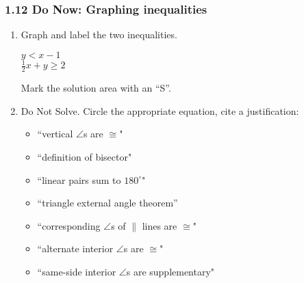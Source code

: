 \documentclass[12pt, twoside]{article}
\begin{document}
\subsubsection*{1.12 Do Now: Graphing inequalities}
\begin{enumerate}
  \item Graph and label the two inequalities.

  \begin{multicols}{2}
    $y < x-1$ \\
    $\frac{1}{2}x + y \geq 2$
    \end{multicols} \vspace{1cm}

  \begin{center} %
  \end{center}

Mark the solution area with an ``S''.

\newpage
\item Do Not Solve. Circle the appropriate equation, cite a  justification:
\begin{multicols}{2}
  \begin{itemize} 
    \item ``vertical $\angle$s are $\cong$" 
    \item ``definition of bisector" 
    \item ``linear pairs sum to $180^\circ$" 
    \item ``triangle external angle theorem''
    \item ``corresponding $\angle$s of $\parallel$ lines are $\cong$" 
    \item ``alternate interior $\angle$s are $\cong$"
    \item ``same-side interior $\angle$s are supplementary"
  \end{itemize}
\end{multicols}
\begin{enumerate}


\end{enumerate}
\end{enumerate}
\end{document}

